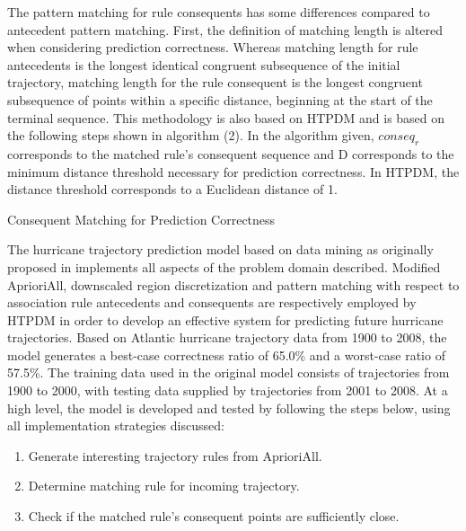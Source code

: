 \documentclass[12pt,conference]{IEEEtran}
\begin{document}
The pattern matching for rule consequents has some differences compared to antecedent pattern matching. First, the definition of matching length is altered when considering prediction correctness. Whereas matching length for rule antecedents is the longest identical congruent subsequence of the initial trajectory, matching length for the rule consequent is the longest congruent subsequence of points within a specific distance, beginning at the start of the terminal sequence. This methodology is also based on HTPDM and is based on the following steps shown in algorithm (2). In the algorithm given, $conseq_{r}$ corresponds to the matched rule's consequent sequence and D corresponds to the minimum distance threshold necessary for prediction correctness. In HTPDM, the distance threshold corresponds to a Euclidean distance of 1.

\begin{algorithm}[H]
  \caption{Consequent Matching for Prediction Correctness}
  \label{consequent_matching}
  \begin{algorithmic}[1]
  \EndIf
  \end{algorithmic}
\end{algorithm}

The hurricane trajectory prediction model based on data mining as originally proposed in \cite{major-hurricane-model} implements all aspects of the problem domain described. Modified AprioriAll, downscaled region discretization and pattern matching with respect to association rule antecedents and consequents are respectively employed by HTPDM in order to develop an effective system for predicting future hurricane trajectories. Based on Atlantic hurricane trajectory data from 1900 to 2008, the model generates a best-case correctness ratio of 65.0\% and a worst-case ratio of 57.5\%. The training data used in the original model consists of trajectories from 1900 to 2000, with testing data supplied by trajectories from 2001 to 2008. At a high level, the model is developed and tested by following the steps below, using all implementation strategies discussed: 

\begin{enumerate}
\item Generate interesting trajectory rules from AprioriAll.
\item Determine matching rule for incoming trajectory.
\item Check if the matched rule's consequent points are sufficiently close.
\end{enumerate}
\end{document}
